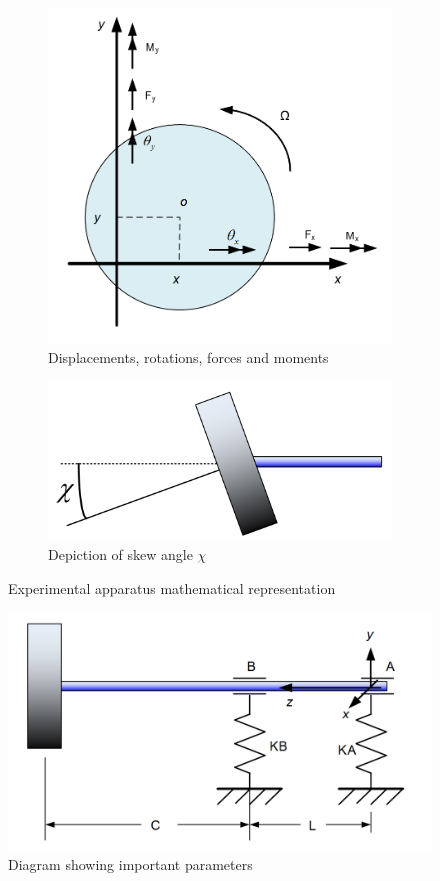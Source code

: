 		\begin{figure}[h]
			
			\begin{subfigure}[b]{.5\textwidth}
 				\centering
 				 \includegraphics[width=.75\linewidth]{./figures/Images/Figure_1a.png}
 				 \caption{Displacements, rotations, forces and moments}
 				 \label{fig:Figure_1a}
 				 \centering
			\end{subfigure}%
			\begin{subfigure}[b]{.5\textwidth}
  				\centering
  				\includegraphics[width=.75\linewidth]{./figures/Images/Figure_1b.png}
  				\caption{Depiction of skew angle $\chi$}
  				\label{fig:Figure_1b}
  				\centering
			\end{subfigure}
			\caption{Experimental apparatus mathematical representation}
			\label{fig:Figure_1}
			
		\end{figure}
		\begin{figure}[h]
			\centering
			\includegraphics[scale=.25]{./figures/Images/Figure_2.png}
			\caption{Diagram showing important parameters}
			\label{fig:Figure_2}
			\centering
		\end{figure}

